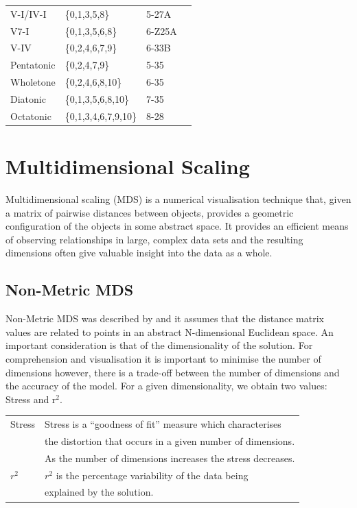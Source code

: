 \documentclass{article}
\begin{document}
\begin{table}[htb]
\begin{center}
\begin{tabular}{lllr}
\hline
 V-I/IV-I    &  \{0,1,3,5,8\}         &  5-27A     \\
 V7-I        &  \{0,1,3,5,6,8\}       &  6-Z25A    \\
 V-IV        &  \{0,2,4,6,7,9\}       &  6-33B   \\
\hline
 Pentatonic  &  \{0,2,4,7,9\}         &  5-35     \\
 Wholetone   &  \{0,2,4,6,8,10\}      &  6-35     \\
 Diatonic    &  \{0,1,3,5,6,8,10\}    &  7-35     \\
 Octatonic   &  \{0,1,3,4,6,7,9,10\}  &  8-28    \\
\hline
\end{tabular}
\end{center}
\end{table}
\section{Multidimensional Scaling}
\label{sec-4}

Multidimensional scaling (MDS) is a numerical visualisation technique
that, given a matrix of pairwise distances between objects, provides a
geometric configuration of the objects in some abstract space. It
provides an efficient means of observing relationships in large,
complex data sets and the resulting dimensions often give valuable
insight into the data as a whole.
\subsection{Non-Metric MDS}
\label{sec-4-1}

Non-Metric MDS was described by \citet{Shepard1962} and it assumes
that the distance matrix values are related to points in an abstract
N-dimensional Euclidean space. An important consideration is that of
the dimensionality of the solution. For comprehension and
visualisation it is important to minimise the number of dimensions
however, there is a trade-off between the number of dimensions and the
accuracy of the model. For a given dimensionality, we obtain two
values: Stress and r$^2$.

\begin{center}
\begin{tabular}{ll}
 Stress  &  Stress is a ``goodness of fit'' measure which characterises  \\
         &  the distortion that occurs in a given number of dimensions.  \\
         &  As the number of dimensions increases the stress decreases.  \\
 $r^2$   &  $r^2$ is the percentage variability of the data being        \\
         &  explained by the solution.                                   \\
\end{tabular}
\end{center}
\end{document}

